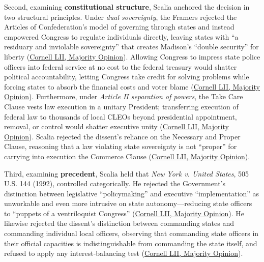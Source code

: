 \documentclass[12pt]{article}
\begin{document}
Second, examining \textbf{constitutional structure}, Scalia anchored the decision in two structural principles. Under \textit{dual sovereignty}, the Framers rejected the Articles of Confederation's model of governing through states and instead empowered Congress to regulate individuals directly, leaving states with ``a residuary and inviolable sovereignty'' that creates Madison's ``double security'' for liberty (\href{https://www.law.cornell.edu/supct/html/95-1478.ZO.html}{Cornell LII, Majority Opinion}). Allowing Congress to impress state police officers into federal service at no cost to the federal treasury would shatter political accountability, letting Congress take credit for solving problems while forcing states to absorb the financial costs and voter blame (\href{https://www.law.cornell.edu/supct/html/95-1478.ZO.html}{Cornell LII, Majority Opinion}). Furthermore, under \textit{Article II separation of powers}, the Take Care Clause vests law execution in a unitary President; transferring execution of federal law to thousands of local CLEOs beyond presidential appointment, removal, or control would shatter executive unity (\href{https://www.law.cornell.edu/supct/html/95-1478.ZO.html}{Cornell LII, Majority Opinion}). Scalia rejected the dissent's reliance on the Necessary and Proper Clause, reasoning that a law violating state sovereignty is not ``proper'' for carrying into execution the Commerce Clause (\href{https://www.law.cornell.edu/supct/html/95-1478.ZO.html}{Cornell LII, Majority Opinion}).

Third, examining \textbf{precedent}, Scalia held that \textit{New York v. United States}, 505 U.S. 144 (1992), controlled categorically. He rejected the Government's distinction between legislative ``policymaking'' and executive ``implementation'' as unworkable and even more intrusive on state autonomy---reducing state officers to ``puppets of a ventriloquist Congress'' (\href{https://www.law.cornell.edu/supct/html/95-1478.ZO.html}{Cornell LII, Majority Opinion}). He likewise rejected the dissent's distinction between commanding states and commanding individual local officers, observing that commanding state officers in their official capacities is indistinguishable from commanding the state itself, and refused to apply any interest-balancing test (\href{https://www.law.cornell.edu/supct/html/95-1478.ZO.html}{Cornell LII, Majority Opinion}).
\end{document}
